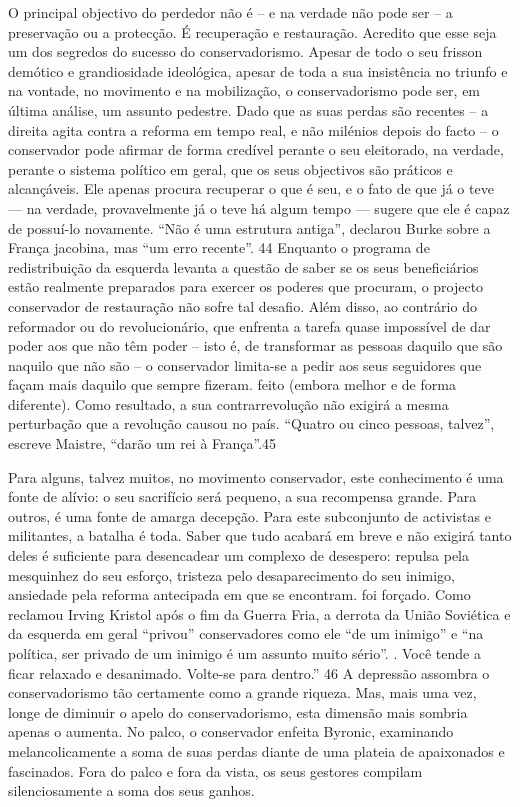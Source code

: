 O principal objectivo do perdedor não é – e na verdade não pode ser – a preservação ou a protecção. É recuperação e restauração. Acredito que esse seja um dos segredos do sucesso do conservadorismo. Apesar de todo o seu frisson demótico e grandiosidade ideológica, apesar de toda a sua insistência no triunfo e na vontade, no movimento e na mobilização, o conservadorismo pode ser, em última análise, um assunto pedestre. Dado que as suas perdas são recentes – a direita agita contra a reforma em tempo real, e não milénios depois do facto – o conservador pode afirmar de forma credível perante o seu eleitorado, na verdade, perante o sistema político em geral, que os seus objectivos são práticos e alcançáveis. Ele apenas procura recuperar o que é seu, e o fato de que já o teve — na verdade, provavelmente já o teve há algum tempo — sugere que ele é capaz de possuí-lo novamente. “Não é uma estrutura antiga”, declarou Burke sobre a França jacobina, mas “um erro recente”. {\color{blue}44} Enquanto o programa de redistribuição da esquerda levanta a questão de saber se os seus beneficiários estão realmente preparados para exercer os poderes que procuram, o projecto conservador de restauração não sofre tal desafio. Além disso, ao contrário do reformador ou do revolucionário, que enfrenta a tarefa quase impossível de dar poder aos que não têm poder – isto é, de transformar as pessoas daquilo que são naquilo que não são – o conservador limita-se a pedir aos seus seguidores que façam mais daquilo que sempre fizeram. feito (embora melhor e de forma diferente). Como resultado, a sua contrarrevolução não exigirá a mesma perturbação que a revolução causou no país. “Quatro ou cinco pessoas, talvez”, escreve Maistre, “darão um rei à França”.{\color{blue}45}
 \par 
Para alguns, talvez muitos, no movimento conservador, este conhecimento é uma fonte de alívio: o seu sacrifício será pequeno, a sua recompensa grande. Para outros, é uma fonte de amarga decepção. Para este subconjunto de activistas e militantes, a batalha é toda. Saber que tudo acabará em breve e não exigirá tanto deles é suficiente para desencadear um complexo de desespero: repulsa pela mesquinhez do seu esforço, tristeza pelo desaparecimento do seu inimigo, ansiedade pela reforma antecipada em que se encontram. foi forçado. Como reclamou Irving Kristol após o fim da Guerra Fria, a derrota da União Soviética e da esquerda em geral “privou” conservadores como ele “de um inimigo” e “na política, ser privado de um inimigo é um assunto muito sério”. . Você tende a ficar relaxado e desanimado. Volte-se para dentro.” {\color{blue}46} A depressão assombra o conservadorismo tão certamente como a grande riqueza. Mas, mais uma vez, longe de diminuir o apelo do conservadorismo, esta dimensão mais sombria apenas o aumenta. No palco, o conservador enfeita Byronic, examinando melancolicamente a soma de suas perdas diante de uma plateia de apaixonados e fascinados. Fora do palco e fora da vista, os seus gestores compilam silenciosamente a soma dos seus ganhos.
